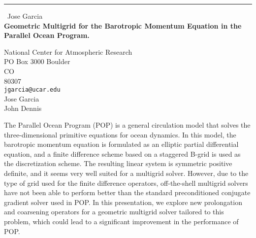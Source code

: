 \documentclass{report}
\begin{document}
\begin{center}
\rule{6in}{1pt} \
{\large Jose Garcia \\
{\bf Geometric Multigrid for the Barotropic Momentum Equation in the Parallel Ocean Program.}}

National Center for Atmospheric Research \\ PO Box 3000 Boulder \\ CO \\ 80307
\\
{\tt jgarcia@ucar.edu}\\
Jose Garcia\\
John Dennis \end{center}

The Parallel Ocean Program (POP) is a general circulation model that
solves the three-dimensional primitive equations for ocean dynamics. In
this model, the barotropic momentum equation is formulated as an elliptic
partial differential equation, and a finite difference scheme based on a
staggered B-grid is used as the discretization scheme. The resulting
linear system is symmetric positive definite, and it seems very well
suited for a multigrid solver. However, due to the type of grid used for
the finite difference operators, off-the-shell multigrid solvers have not
been able to perform better than the standard preconditioned conjugate
gradient solver used in POP. In this presentation, we explore new
prolongation and coarsening operators for a geometric multigrid solver
tailored to this problem, which could lead to a significant improvement
in the performance of POP.
\end{document}
